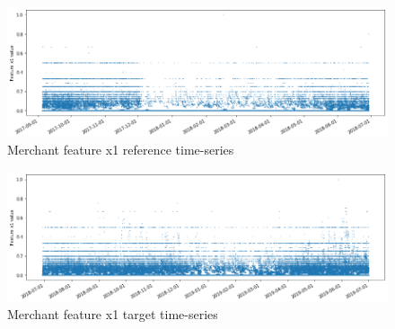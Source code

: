 



\begin{figure}[!htb]
    \begin{center}
      \includegraphics[scale=0.5]{figures/merchant-x1-reference.png}
      \caption{Merchant feature x1 reference time-series}
      \label{fig:merchant-x1-reference}
    \end{center}
\end{figure}

\begin{figure}[!htb]
    \begin{center}
      \includegraphics[scale=0.5]{figures/merchant-x1-target.png}
      \caption{Merchant feature x1 target time-series}
      \label{fig:merchant-x1-target}
    \end{center}
\end{figure}


